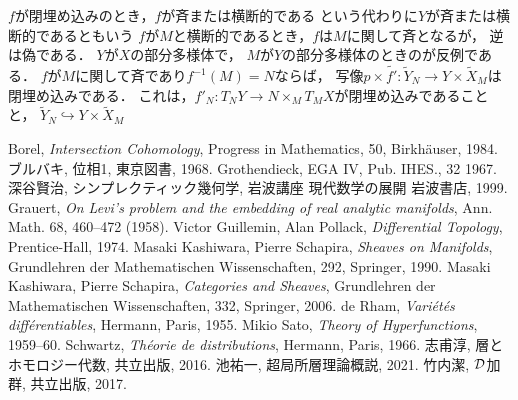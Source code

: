 \(f\)が閉埋め込みのとき，\(f\)が斉または横断的である
という代わりに\(Y\)が斉または横断的であるともいう
\(f\)が\(M\)と横断的であるとき，\(f\)は\(M\)に関して斉となるが，
逆は偽である．
\(Y\)が\(X\)の部分多様体で，
\(M\)が\(Y\)の部分多様体のときのが反例である．
\(f\)が\(M\)に関して斉であり\(f^{-1}(M)=N\)ならば，
写像\(
    p\times\tilde{f'}\colon
    \widetilde{Y}_N\to Y\times \widetilde{X}_M
\)は閉埋め込みである．
これは，\(f'_N\colon T_{N}Y\to N\times_{M}T_{M}X\)が閉埋め込みであることと，
\(\widetilde{Y}_{N}\hookrightarrow Y\times \widetilde{X}_M\)


















\begin{thebibliography}{20} 
     Borel, 
        \textit{Intersection Cohomology}, 
        Progress in Mathematics, 50, Birkh\"auser, 1984.
     ブルバキ, 位相1, 東京図書, 1968.
     Grothendieck, EGA IV, Pub. IHES., 32 1967.
     深谷賢治, シンプレクティック幾何学, 岩波講座 現代数学の展開 岩波書店, 1999.
     Grauert, 
        \textit{On Levi's problem and the embedding of real analytic manifolds}, 
        Ann. Math. 68, 460--472 (1958).
     Victor Guillemin, Alan Pollack, 
        \textit{Differential Topology}, 
        Prentice-Hall, 1974.
     Masaki Kashiwara, Pierre Schapira, 
        \textit{Sheaves on Manifolds}, 
        Grundlehren der Mathematischen Wissenschaften, 292, Springer, 1990.
     Masaki Kashiwara, Pierre Schapira, 
        \textit{Categories and Sheaves}, 
        Grundlehren der Mathematischen Wissenschaften, 332, Springer, 2006.
     de Rham, 
        \textit{Vari\'et\'es diff\'erentiables}, 
        Hermann, Paris, 1955.
     Mikio Sato, 
        \textit{Theory of Hyperfunctions}, 
        1959--60.
     Schwartz, 
        \textit{Th\'eorie de distributions}, 
        Hermann, Paris, 1966.
     志甫淳, 層とホモロジー代数, 共立出版, 2016.
     池祐一, 超局所層理論概説, 2021.
     竹内潔, \(\mathcal{D}\)加群, 共立出版, 2017.
\end{thebibliography}




